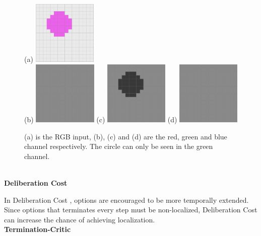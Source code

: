 \documentclass{article}
\begin{document}
	\begin{figure}[h]
		\centering
		\large{(a)}
		\includegraphics[width=1.2in]{rgb.png}\\
		\large{(b)}
		\includegraphics[width=1.2in]{rb.png}
		\hspace{0.2in}
		\large{(c)}
		\includegraphics[width=1.2in]{g.png}
		\hspace{0.2in}
		\large{(d)}
		\includegraphics[width=1.2in]{rb.png}
		\caption{(a) is the RGB input, (b), (c) and (d) are the red, green and blue channel respectively. The circle can only be seen in the green channel.}
	\end{figure}\vspace{0.15in}\\
	\large{\bfseries{Deliberation Cost}}\vspace{0.05in}
	
	\normalsize{\quad In Deliberation Cost \cite{harb2017waiting}, options are encouraged to be more temporally extended. Since options that terminates every step must be non-localized, Deliberation Cost can increase the chance of achieving localization.}\vspace{0.15in}\\
	\large{\bfseries{Termination-Critic}}\vspace{0.05in}
	
\end{document}
